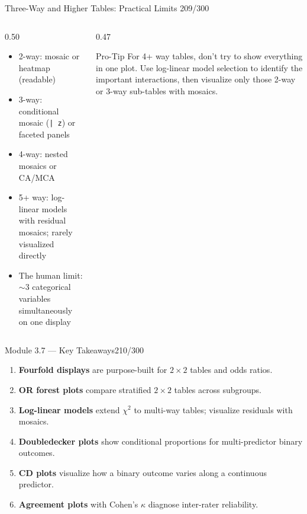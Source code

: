 \documentclass[10pt]{beamer}
\newcommand{\smark}[1]{\hfill{\scriptsize\color{codegray}#1}}
\begin{document}
\begin{frame}{Three-Way and Higher Tables: Practical Limits}
\smark{209/300}
\begin{columns}[T]
\begin{column}{0.50\textwidth}
\begin{itemize}
    \item 2-way: mosaic or heatmap (readable)
    \item 3-way: conditional mosaic (\texttt{| z}) or faceted panels
    \item 4-way: nested mosaics or CA/MCA
    \item 5+ way: log-linear models with residual mosaics; rarely visualized directly
    \item The human limit: $\sim$3 categorical variables simultaneously on one display
\end{itemize}
\end{column}
\begin{column}{0.47\textwidth}
\begin{alertblock}{Pro-Tip}
    \scriptsize For 4+ way tables, don't try to show everything in one plot. Use log-linear model selection to identify the important interactions, then visualize only those 2-way or 3-way sub-tables with mosaics.
\end{alertblock}
\end{column}
\end{columns}
\end{frame}

\begin{frame}{Module 3.7 --- Key Takeaways}\smark{210/300}
\begin{enumerate}
    \item \textbf{Fourfold displays} are purpose-built for $2 \times 2$ tables and odds ratios.
    \item \textbf{OR forest plots} compare stratified $2 \times 2$ tables across subgroups.
    \item \textbf{Log-linear models} extend $\chi^2$ to multi-way tables; visualize residuals with mosaics.
    \item \textbf{Doubledecker plots} show conditional proportions for multi-predictor binary outcomes.
    \item \textbf{CD plots} visualize how a binary outcome varies along a continuous predictor.
    \item \textbf{Agreement plots} with Cohen's $\kappa$ diagnose inter-rater reliability.
\end{enumerate}
\end{frame}
\end{document}

